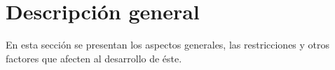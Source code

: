 \section{Descripción general}

En esta sección se presentan los aspectos generales, las restricciones y otros factores que afecten al desarrollo de éste.